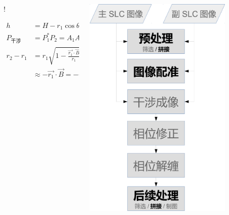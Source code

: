 \documentclass{beamer}
\begin{document}
\begin{frame}
\begin{columns}
\begin{column}{0.5\textwidth}
             {!} {
                \begin{minipage}{\linewidth}
                \begin{align*}
                    h &= H - r_1 \cos\theta \\
                    P_{\textrm{干涉}} &= P_1^* P_2 =  A_1 A_2 \exp(i \frac{4\pi}{\lambda}(r_2 - r_1)) \\
                    r_2 - r_1 &= r_1 \sqrt{1- \frac{\vec{r_1} \cdot \vec{B}}{r_1} + (\frac{B}{r_1})^2} \qquad \because B \ll |\vec{r}| \\
                              &\approx - \vec{r_1} \cdot \vec{B}
                              = - r_1 B \cos(\frac{\pi}{2} - \theta + \alpha)
                \end{align*}
                \end{minipage}
            }
        \end{column}
        \begin{column}{0.4\textwidth}
            \centering
            \includegraphics[width=0.8\textwidth]{figures/process.pdf}
        \end{column}
    \end{columns}
\end{frame}
\end{document}

